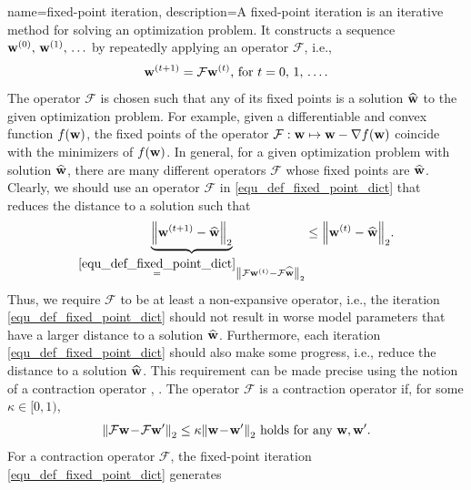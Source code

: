 {
{name={fixed-point iteration},
	description={A fixed-point iteration is an iterative method 
	     for solving an optimization problem. It constructs a sequence ${\bf w}^{(0)}, \,{\bf w}^{(1)}, \,\ldots$ by 
		 repeatedly applying an operator $\mathcal{F}$, i.e., 
		 \begin{equation} 
		 	\label{equ_def_fixed_point_dict} 
		 	{\bf w}^{(t+1)} = \mathcal{F} {\bf w}^{(t)} \mbox{, for } t=0, \,1, \,\ldots.
		 \end{equation} 
		 The operator $\mathcal{F}$ is chosen such that any of its fixed points is a solution 
		 $\widehat{{\bf w}}$ to the given optimization problem. For example, given a differentiable and 
		 convex function $f({\bf w})$, the fixed points of the operator $\mathcal{F}: {\bf w} \mapsto {\bf w} - \nabla f({\bf w})$ 
		 coincide with the minimizers of $f({\bf w})$. In general, for a given optimization problem 
		 with solution $\widehat{{\bf w}}$, there are many different operators 
		 $\mathcal{F}$ whose fixed points are $\widehat{{\bf w}}$. Clearly, we should use an 
		 operator $\mathcal{F}$ in \eqref{equ_def_fixed_point_dict} that reduces the 
		 distance to a solution such that
		 \begin{equation} 
			\nonumber
			\underbrace{\mleft\lVert  {\bf w}^{(t+1)} - \widehat{{\bf w}} \mright\rVert_{2}}_{\stackrel{\eqref{equ_def_fixed_point_dict}}{=} \mleft\lVert  \mathcal{F} {\bf w}^{(t)} - \mathcal{F}\widehat{{\bf w}} \mright\rVert_{2}}  \leq 	\mleft\lVert  {\bf w}^{(t)} - \widehat{{\bf w}} \mright\rVert_{2}. 
		\end{equation}
		Thus, we require $\mathcal{F}$ to be at least a non-expansive operator, i.e., the iteration \eqref{equ_def_fixed_point_dict} 
		should not result in worse model parameters that have a larger distance to a solution $\widehat{{\bf w}}$. 
		Furthermore, each iteration \eqref{equ_def_fixed_point_dict} should also make some progress, i.e., 
		reduce the distance to a solution $\widehat{{\bf w}}$. This requirement can be made precise using 
		the notion of a contraction operator \cite{Bauschke:2017}, \cite{fixedpoinIsta}. 
		The operator $\mathcal{F}$ is a contraction operator if, for some $\kappa \in [0,1)$,
		\begin{equation} 
			\nonumber
			\mleft\lVert  \mathcal{F} {\bf w}\!-\!\mathcal{F} {\bf w}' \mright\rVert_{2}  \leq  \kappa	\mleft\lVert {\bf w}\!-\!{\bf w}' \mright\rVert_{2} \mbox{ holds for any } {\bf w},{\bf w}'.
		\end{equation}
		For a contraction operator $\mathcal{F}$, the fixed-point iteration \eqref{equ_def_fixed_point_dict} generates 
}}}
